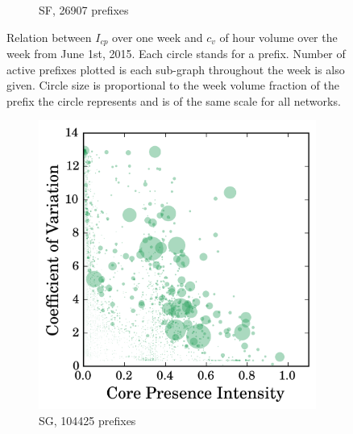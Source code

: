 \begin{figure}
\begin{subfigure}[b]{0.49\textwidth}
                \caption{SF, 26907 prefixes}
                \label{fig:cv_cp_sf}
        \end{subfigure}
\caption{Relation between $I_{cp}$ over one week and $c_v$ of hour volume over the week from June 1st, 2015. Each circle stands for a prefix. Number of active prefixes plotted is each sub-graph throughout the week is also given. Circle size is proportional to the week volume fraction of the prefix the circle represents and is of the same scale for all networks.}
\label{fig:cv_cp}
\end{figure}
\begin{figure}\ContinuedFloat
	\centering
        \begin{subfigure}[b]{0.49\textwidth}
                \includegraphics[width=\textwidth]{gfx/chap2/corre_cv_cp_sg.png}
                \caption{SG, 104425 prefixes}
                \label{fig:cv_cp_sg}
        \end{subfigure}
        \begin{subfigure}[b]{0.49\textwidth}

\end{subfigure}
\end{figure}
